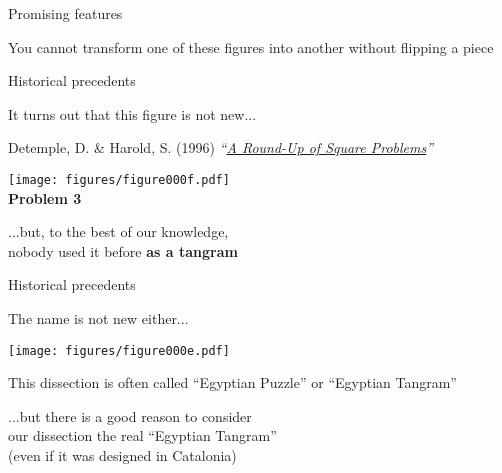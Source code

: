 \documentclass[14pt]{beamer}
\begin{document}
\begin{frame}{Promising features}
\begin{center}
            \bigskip

            {\footnotesize You cannot transform one of these figures into another without flipping a piece}
        \end{center}
    \end{frame}


    \begin{frame}{Historical precedents}
        \begin{center}
            It turns out that this figure is not new...

            \bigskip\medskip

            {\footnotesize Detemple, D. \& Harold, S. (1996) \emph{``\href{https://doi.org/10.2307/2691390}{A Round-Up of Square Problems}''}}\\

            \bigskip

            \texttt{[image: figures/figure000f.pdf]}\\[-1ex]{\footnotesize \textbf{Problem 3}}

            \bigskip

            ...but, to the best of our knowledge,\\nobody used it before \textbf{as a tangram}
        \end{center}
    \end{frame}


    \begin{frame}{Historical precedents}
        \begin{center}
            The name is not new either...

            \bigskip \bigskip

            \texttt{[image: figures/figure000e.pdf]}

            \medskip

            {\footnotesize This dissection is often called ``Egyptian Puzzle'' or ``Egyptian Tangram''}

            \bigskip \bigskip

            ...but there is a good reason to consider\\ our dissection the real ``Egyptian Tangram''\\{\footnotesize (even if it was designed in Catalonia)}
        \end{center}
    \end{frame}
\end{document}
